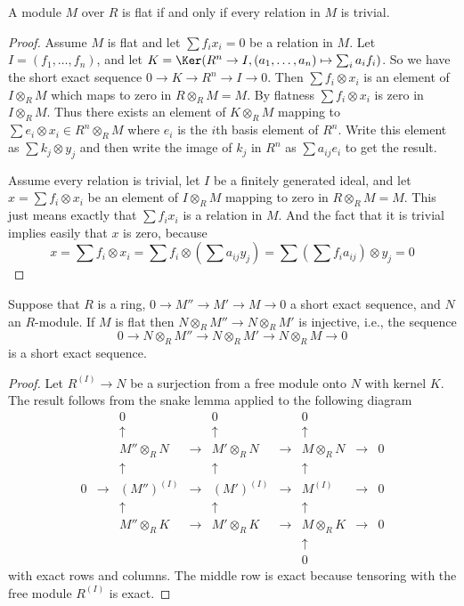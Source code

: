 \begin{lemma}
\label{lemma-flat-eq}
A module $M$ over $R$ is flat if and only if
every relation in $M$ is trivial.
\end{lemma}

\begin{proof}
Assume $M$ is flat and let $\sum f_i x_i = 0$ be a relation in $M$.
Let $I = (f_1, \ldots, f_n)$, and let
$K = \Ker(R^n \to I, (a_1, \ldots, a_n) \mapsto \sum_i a_i f_i)$.
So we have the short exact sequence
$0 \to K \to R^n \to I \to 0$. Then $\sum f_i \otimes x_i$
is an element of $I \otimes_R M$ which maps
to zero in $R \otimes_R M = M$. By flatness
$\sum f_i \otimes x_i$ is zero in $I \otimes_R M$.
Thus there exists an element of $K \otimes_R M$ mapping
to $\sum e_i \otimes x_i \in R^n \otimes_R M$ where $e_i$
is the $i$th basis element of $R^n$.
Write this element as $\sum k_j \otimes y_j$
and then write the image of $k_j$ in $R^n$ as
$\sum a_{ij} e_i$ to get the result.

\medskip\noindent
Assume every relation is trivial, let $I$
be a finitely generated ideal, and let $x = \sum f_i \otimes x_i$
be an element of $I \otimes_R M$ mapping to zero in $R \otimes_R M = M$.
This just means exactly that $\sum f_i x_i$ is a relation in
$M$. And the fact that it is trivial implies easily that
$x$ is zero, because
$$
x
=
\sum f_i \otimes x_i
=
\sum f_i \otimes \left(\sum a_{ij}y_j\right)
=
\sum \left(\sum f_i a_{ij}\right) \otimes y_j
=
0
$$
\end{proof}

\begin{lemma}
\label{lemma-flat-tor-zero}
Suppose that $R$ is a ring, $0 \to M'' \to M' \to M \to 0$
a short exact sequence, and $N$ an $R$-module. If $M$ is flat
then $N \otimes_R M'' \to N \otimes_R M'$ is injective, i.e., the
sequence
$$
0 \to N \otimes_R M'' \to N \otimes_R M' \to N \otimes_R M \to 0
$$
is a short exact sequence.
\end{lemma}

\begin{proof}
Let $R^{(I)} \to N$ be a surjection from a free module
onto $N$ with kernel $K$. The result follows
from the snake lemma applied to the following diagram
$$
\begin{matrix}
 & & 0 & & 0 & & 0 & & \\
 & & \uparrow & & \uparrow & & \uparrow & & \\
 & & M''\otimes_R N & \to & M' \otimes_R N & \to & M \otimes_R N & \to & 0 \\
 & & \uparrow & & \uparrow & & \uparrow & & \\
0 & \to & (M'')^{(I)} & \to & (M')^{(I)} & \to & M^{(I)} & \to & 0 \\
 & & \uparrow & & \uparrow & & \uparrow & & \\
 & & M''\otimes_R K & \to & M' \otimes_R K & \to & M \otimes_R K & \to & 0 \\
 & & & & & & \uparrow & & \\
 & & & & & & 0 & &
\end{matrix}
$$
with exact rows and columns. The middle row is exact because tensoring
with the free module $R^{(I)}$ is exact.
\end{proof}


